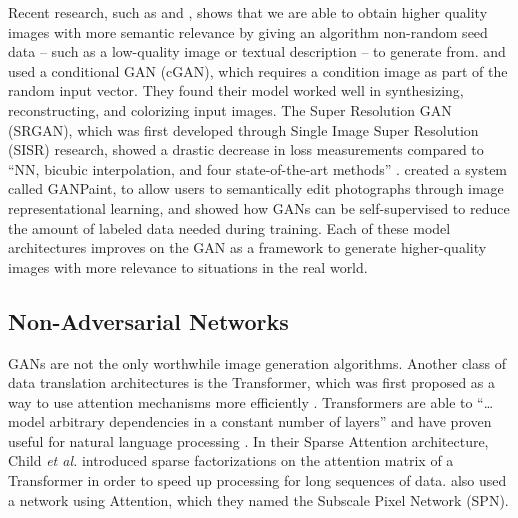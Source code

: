 \documentclass{article}
\begin{document}
Recent research, such as \cite{texture_synthesis} and \cite{multiscale_video},
shows that we are able to obtain
higher quality images with more semantic relevance by giving
an algorithm non-random seed data
-- such as a low-quality image or textual description -- to generate from.
\cite{image_to_image} and \cite{deep_video} used a conditional GAN (cGAN),
which requires a condition image as part of the random input vector.
They found their model worked well in
synthesizing, reconstructing, and colorizing input images.
The Super Resolution GAN (SRGAN), which was first developed through
Single Image Super Resolution (SISR) research,
showed a drastic decrease in loss measurements
compared to ``NN, bicubic interpolation, and four state-of-the-art methods''
\cite{srgan}.
\cite{semantic_photo} created a system called GANPaint, to allow users to
semantically edit photographs through image representational learning,
and \cite{fewer_labels} showed how GANs can be self-supervised to reduce
the amount of labeled data needed during training.
Each of these model architectures improves on the GAN as a framework to generate
higher-quality images with more relevance to situations in the real world.

\subsection{Non-Adversarial Networks}
\label{subsec:non_adversarial}
GANs are not the only worthwhile image generation algorithms.
Another class of data translation architectures is the Transformer,
which was first proposed as a way to use attention mechanisms more efficiently
\cite{attention_need}.
Transformers are able to ``\dots model arbitrary dependencies
in a constant number of layers'' and have proven useful for natural language processing \cite{generative_transformers}.
In their Sparse Attention architecture,
Child \textit{et al.} introduced sparse factorizations on the attention matrix
of a Transformer in order to speed up processing for long sequences of
data.
\cite{subscale_pixel} also used a network using Attention, which they named
the Subscale Pixel Network (SPN).
 
\end{document}
